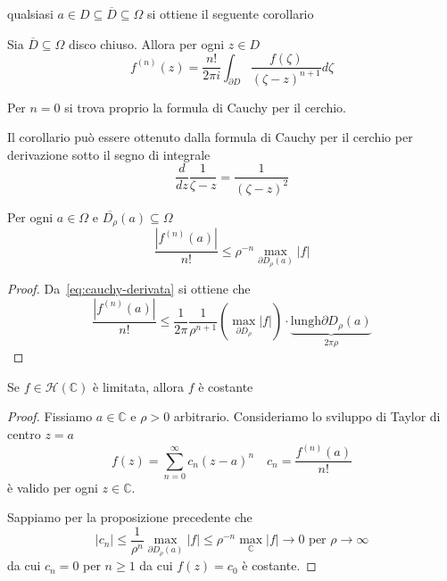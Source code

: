 qualsiasi \(a \in D \subseteq \overline{D} \subseteq \Omega  \)  si ottiene il seguente corollario
\begin{corollary}
    Sia \(\overline{D} \subseteq \Omega \) disco chiuso. Allora per ogni \(z \in
    D\) 
    \begin{equation}\label{eq:cauchy-derivata}
        f^{{(n)}}{(z)} = \frac{n!}{2\pi i} \int_{\partial D} \frac{f{(\zeta)}}{{(\zeta
        - z)}^{n+1}} d \zeta
    \end{equation}
\end{corollary}
\begin{remark}
    Per \(n = 0\) si trova proprio la formula di Cauchy per il cerchio.
\end{remark}
\begin{remark}
    Il corollario può essere ottenuto dalla formula di Cauchy per il cerchio per
    derivazione sotto il segno di integrale
    \[
        \frac{d}{dz} \frac{1}{\zeta - z} = \frac{1}{{(\zeta - z)}^2}
    \]
\end{remark}
\begin{proposition}
    Per ogni \(a \in \Omega\) e \(\overline{D_\rho}{(a)} \subseteq \Omega \)
    \[
        \frac{|f^{{(n)}}{(a)}|}{n!} \le {\rho^{-n}} \max_{\partial D_{\rho}{(a)}
        }|f|
    \]
\end{proposition}
\begin{proof}
    Da~\eqref{eq:cauchy-derivata} si ottiene che
    \[
        \frac{|f^{{(n)}}{(a)}|}{n!} \le  \frac{1}{ 2\pi } \frac{1}{\rho^{n+1}}
        {\left( \max_{\partial D_{\rho} } |f| \right)} \cdot \underbrace{\text{lungh}
        \partial D_{\rho}{(a)}}_{2\pi \rho} 
    \]
\end{proof}
\begin{theorem}[Liouville]
    Se \(f \in \mathcal{H}{(\mathbb{C})}\) è limitata, allora \(f\) è costante 
\end{theorem}
\begin{proof}
    Fissiamo \(a \in \mathbb{C}\) e \(\rho > 0\) arbitrario. Consideriamo lo
    sviluppo di Taylor di centro \(z = a\) 
    \[
        f{(z)} = \sum_{n=0}^{\infty} c_{n} {(z-a)}^{n} \quad c_{n} =
        \frac{f^{{(n)}}{(a)}}{n!}
    \]
    è valido per ogni \(z \in \mathbb{C}\).

    Sappiamo per la proposizione precedente che
    \[
        |c_{n}| \le \frac{1}{\rho^{n}} \max_{\partial D_{\rho}{(a)}} |f| \le
        \rho^{-n} \max_{\mathbb{C}} |f| \to 0 \text{ per } \rho \to \infty
    \]
    da cui \(c_{n} = 0\) per \( n \ge 1\) da cui \(f{(z)}  = c_{0}\) è costante.
\end{proof}
